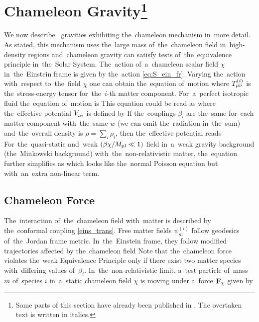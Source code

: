 \section[Chameleon Gravity]{Chameleon Gravity\footnote{Some parts of this section have already been published in \textcite{mastersthesis_vrastil}. The overtaken text is written in italics.}}
\label{sec_cham}
We now describe \fR\ gravities exhibiting the~chameleon mechanism in~more detail. As stated, this mechanism uses the~large mass of~the~chameleon field in~high-density regions and~chameleon gravity can satisfy tests of~the~equivalence principle in~the~Solar System. The~action of~a~chameleon scalar field $\chi$ in~the~Einstein frame is given by the~action \eqref{eq:S_ein_fr}. Varying the~action with~respect to~the~field $\chi$ one can obtain the~equation of~motion
where $T^{(i)}_{\mu\nu}$ is the~stress-energy tensor for~the~$i$-th matter component. For~a~perfect isotropic fluid the~equation of~motion is
This equation could be read as
where the~effective potential $V_{_\text{\tiny eff}}$ is defined by
If the~couplings $\beta_i$ are the~same for~each matter component with~the~same $w$ (we can omit the~radiation in~the~sum) and~the~overall density is $\rho=\sum_i\rho_i$, then the~effective potential reads
For~the~quasi-static and~weak $(\beta\chi/M_{\text{\scriptsize pl}}\ll1)$ field in~a~weak gravity background (the~Minkowski background) with~the~non-relativistic matter, the~equation further simplifies as
which looks like the~normal Poisson equation but with~an~extra non-linear term.
\subsection{Chameleon Force}
The~interaction of~the~chameleon field with~matter is described by the~conformal coupling \eqref{eins_trans}. Free matter fields $\psi_m^{(i)}$ follow geodesics of~the~Jordan frame metric. In~the~Einstein frame, they follow modified trajectories affected by the~chameleon field \parencite{Waterhouse:2006wv}
Note that the~chameleon force violates the~weak Equivalence Principle only if there exist two matter species with~differing values of~$\beta_i$. In~the~non-relativistic limit, a~test particle of~mass $m$ of~species $i$ in~a~static chameleon field $\chi$ is moving under a~force $\mathbf{F}_\chi$ given by
